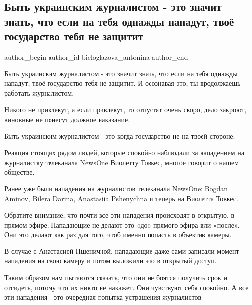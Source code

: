  
 
 
 
 
 
\subsection{Быть украинским журналистом - это значит знать, что если на тебя однажды нападут, твоё государство тебя не защитит}
\label{sec:28_11_2020.fb.bieloglazova_antonina.1.napadenija}
\ifcmt
	author_begin
   author_id bieloglazova_antonina
	author_end
\fi

Быть украинским журналистом - это значит знать, что если на тебя однажды
нападут, твоё государство тебя не защитит. И осознавая это, ты продолжаешь
работать журналистом. 

Никого не привлекут, а если привлекут, то отпустят очень скоро, дело закроют,
виновные не понесут должное наказание. 

Быть украинским журналистом - это когда государство не на твоей стороне.

Реакция стоящих рядом людей, которые спокойно наблюдали за нападением на
журналистку телеканала  NewsOne Виолетту Товкес, многое говорит о нашем
обществе.

Ранее уже были нападения на журналистов телеканала NewsOne: Bogdan Aminov,
Bilera Darina, Anastasiia Pshenychna и теперь на Виолетта Товкес.

Обратите внимание, что почти все эти нападения происходят в открытую, в прямом
эфире. Нападающие не делают это «до» прямого эфира или «после». Они это делают
как раз для того, чтоб именно попасть в объектив камеры.

В случае с Анастасией Пшеничной, нападающие даже сами записали момент нападения
на свою камеру и потом выложили это в открытый доступ.

Таким образом нам пытаются сказать, что они не боятся получить срок и отсидеть,
потому что их никто не накажет. Они чувствуют себя спокойно. А все эти
нападения - это очередная попытка устрашения журналистов.

